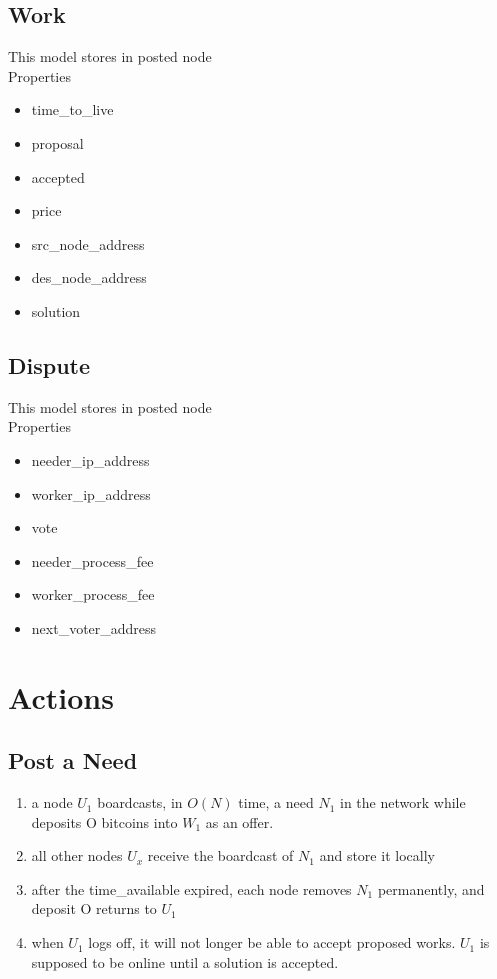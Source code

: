\documentclass[12pt]{article}
\begin{document}
\subsection{Work}
This model stores in posted node\\
Properties
\begin{itemize}
	\item time\_to\_live
	\item proposal
	\item accepted
	\item price
	\item src\_node\_address
	\item des\_node\_address
	\item solution
\end{itemize}

\subsection{Dispute}
This model stores in posted node\\
Properties
\begin{itemize}
	\item needer\_ip\_address
	\item worker\_ip\_address
	\item vote
	\item needer\_process\_fee
	\item worker\_process\_fee
	\item next\_voter\_address
\end{itemize}

\section{Actions}

\subsection{Post a Need}
\begin{enumerate}
	\item a node $U_1$ boardcasts, in $O(N)$ time, a need $N_1$ in the network while deposits O bitcoins into $W_1$ as an offer.
	\item all other nodes $U_x$ receive the boardcast of $N_1$ and store it locally
	\item after the time\_available expired, each node removes $N_1$ permanently, and deposit O returns to $U_1$
	\item when $U_1$ logs off, it will not longer be able to accept proposed works. $U_1$ is supposed to be online until a solution is accepted.  
\end{enumerate}
\end{document}
